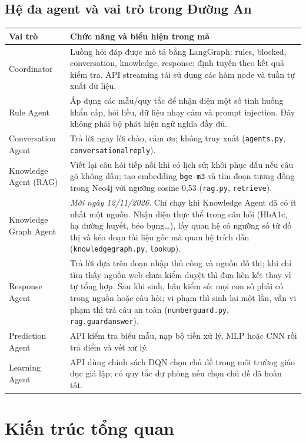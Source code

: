 \documentclass[12pt,a4paper]{article}
\renewcommand{\_}{\textunderscore\allowbreak}\setlength{\emergencystretch}{3em}
\begin{document}
\subsection{Hệ đa agent và vai trò trong Đường An}
\begin{longtable}{p{3.4cm}p{10.6cm}}\toprule
\textbf{Vai trò}&\textbf{Chức năng và biểu hiện trong mã}\\\midrule\endhead
Coordinator & Luồng hỏi đáp được mô tả bằng LangGraph: rules, blocked, conversation, knowledge, response; định tuyến theo kết quả kiểm tra. API streaming tái sử dụng các hàm node và tuần tự xuất dữ liệu.\\
Rule Agent & Áp dụng các mẫu/quy tắc để nhận diện một số tình huống khẩn cấp, hỏi liều, dữ liệu nhạy cảm và prompt injection. Đây không phải bộ phát hiện ngữ nghĩa đầy đủ.\\
Conversation Agent & Trả lời ngay lời chào, cảm ơn; không truy xuất (\texttt{agents.py}, \texttt{conversational\_reply}).\\
Knowledge Agent (RAG) & Viết lại câu hỏi tiếp nối khi có lịch sử; khôi phục dấu nếu câu gõ không dấu; tạo embedding \texttt{bge-m3} và tìm đoạn tương đồng trong Neo4j với ngưỡng cosine 0,53 (\texttt{rag.py}, \texttt{retrieve}).\\
Knowledge Graph Agent & \emph{Mới ngày 12/11/2026.} Chỉ chạy khi Knowledge Agent đã có ít nhất một nguồn. Nhận diện thực thể trong câu hỏi (HbA1c, hạ đường huyết, béo bụng\dots), lấy quan hệ có ngưỡng số từ đồ thị và kéo đoạn tài liệu gốc mà quan hệ trích dẫn (\texttt{knowledge\_graph.py}, \texttt{lookup}).\\
Response Agent & Trả lời dựa trên đoạn nhập thủ công và nguồn đồ thị; khi chỉ tìm thấy nguồn web chưa kiểm duyệt thì đưa liên kết thay vì tự tổng hợp. Sau khi sinh, hậu kiểm số: mọi con số phải có trong nguồn hoặc câu hỏi; vi phạm thì sinh lại một lần, vẫn vi phạm thì trả câu an toàn (\texttt{number\_guard.py}, \texttt{rag.guard\_answer}).\\
Prediction Agent & API kiểm tra biểu mẫu, nạp bộ tiền xử lý, MLP hoặc CNN rồi trả điểm và vết xử lý.\\
Learning Agent & API dùng chính sách DQN chọn chủ đề trong môi trường giáo dục giả lập; có quy tắc dự phòng nếu chọn chủ đề đã hoàn tất.\\\bottomrule
\end{longtable}

\section{Kiến trúc tổng quan}
\end{document}
